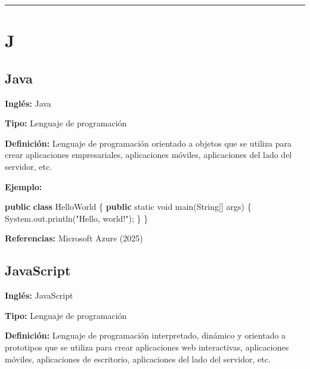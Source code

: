 \documentclass[
  letterpaper,
  DIV=11,
  numbers=noendperiod]{scrreprt}
\newenvironment{Shaded}{\begin{snugshade}}{\end{snugshade}}
\newcommand{\BuiltInTok}[1]{\textcolor[rgb]{0.00,0.23,0.31}{#1}}
\newcommand{\DataTypeTok}[1]{\textcolor[rgb]{0.68,0.00,0.00}{#1}}
\newcommand{\FunctionTok}[1]{\textcolor[rgb]{0.28,0.35,0.67}{#1}}
\newcommand{\KeywordTok}[1]{\textcolor[rgb]{0.00,0.23,0.31}{\textbf{#1}}}
\newcommand{\NormalTok}[1]{\textcolor[rgb]{0.00,0.23,0.31}{#1}}
\newcommand{\OperatorTok}[1]{\textcolor[rgb]{0.37,0.37,0.37}{#1}}
\newcommand{\StringTok}[1]{\textcolor[rgb]{0.13,0.47,0.30}{#1}}
\let\oldsubsection\subsection
\renewcommand{\subsection}{\phantomsection\oldsubsection}
\begin{document}
\begin{center}\rule{0.5\linewidth}{0.5pt}\end{center}

\section*{J}\label{j}


\subsection*{Java}\label{glos-java}

\textbf{Inglés:} Java

\textbf{Tipo:} Lenguaje de programación

\textbf{Definición:} Lenguaje de programación orientado a objetos que se
utiliza para crear aplicaciones empresariales, aplicaciones móviles,
aplicaciones del lado del servidor, etc.

\textbf{Ejemplo:}

\begin{Shaded}
\begin{Highlighting}[]
\KeywordTok{public} \KeywordTok{class}\NormalTok{ HelloWorld }\OperatorTok{\{}
    \KeywordTok{public} \DataTypeTok{static} \DataTypeTok{void} \FunctionTok{main}\OperatorTok{(}\BuiltInTok{String}\OperatorTok{[]}\NormalTok{ args}\OperatorTok{)} \OperatorTok{\{}
        \BuiltInTok{System}\OperatorTok{.}\FunctionTok{out}\OperatorTok{.}\FunctionTok{println}\OperatorTok{(}\StringTok{"Hello, world!"}\OperatorTok{);}
    \OperatorTok{\}}
\OperatorTok{\}}
\end{Highlighting}
\end{Shaded}

\textbf{Referencias:} Microsoft Azure (2025)

\subsection*{JavaScript}\label{glos-javascript}

\textbf{Inglés:} JavaScript

\textbf{Tipo:} Lenguaje de programación

\textbf{Definición:} Lenguaje de programación interpretado, dinámico y
orientado a prototipos que se utiliza para crear aplicaciones web
interactivas, aplicaciones móviles, aplicaciones de escritorio,
aplicaciones del lado del servidor, etc.
\end{document}
